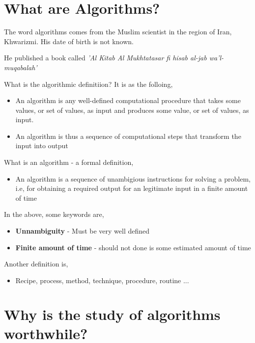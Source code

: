 \documentclass{article}
\begin{document}
    \tableofcontents

    \section{What are Algorithms?}

    The word algorithms comes from the Muslim scientist in the region of Iran, Khwarizmi. His date of birth is not known.

    He published a book called \textit{'Al Kitab Al Mukhtatasar fi hisab al-jab wa'l-muqabalah'}

    What is the algorithmic definitiion? It is as the folloing,
    \begin{itemize}
        \item An algorithm is any well-defined computational procedure that takes some values, or set of values, as input and produces some value, or set of values, as input.
        \item An algorithm is thus a sequence of computational steps that transform the input into output
    \end{itemize}

    What is an algorithm - a formal definition,
    \begin{itemize}
        \item An algorithm is a sequence of unambigious instructions for solving a problem, i.e, for obtaining a required output for an legitimate input in a finite amount of time
    \end{itemize}

    In the above, some keywords are,
    \begin{itemize}
        \item \textbf{Unnambiguity} - Must be very well defined
        \item \textbf{Finite amount of time} - should not done is some estimated amount of time
    \end{itemize}

    Another definition is,
    \begin{itemize}
        \item Recipe, process, method, technique, procedure, routine ...
    \end{itemize}

    \section{Why is the study of algorithms worthwhile?}
\end{document}

